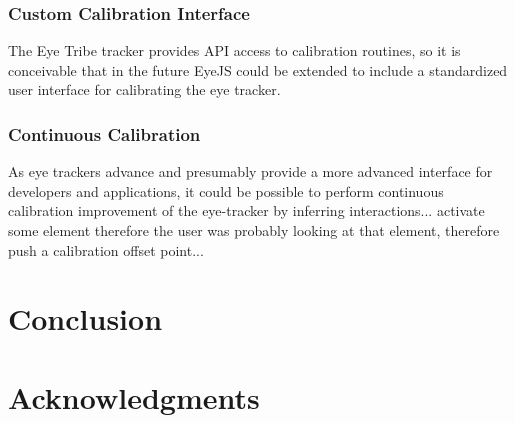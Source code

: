 \documentclass{sigchi}
\begin{document}
\subsubsection{Custom Calibration Interface}
The Eye Tribe tracker provides API access to calibration routines, so it is conceivable that in the future EyeJS could be extended to include a standardized user interface for calibrating the eye tracker.

\subsubsection{Continuous Calibration}
As eye trackers advance and presumably provide a more advanced interface for developers and applications, it could be possible to perform continuous calibration improvement of the eye-tracker by inferring interactions... activate some element therefore the user was probably looking at that element, therefore push a calibration offset point...



\section{Conclusion}



\section{Acknowledgments}



\balance{}



\end{document}
